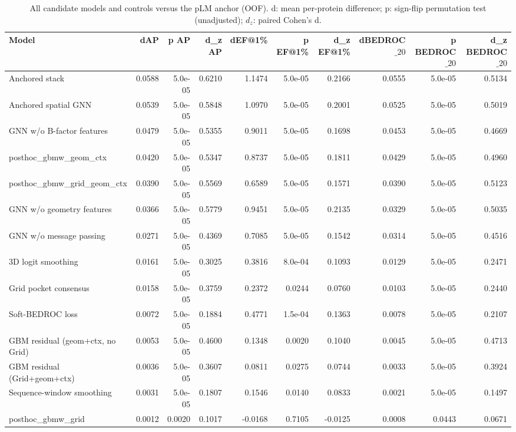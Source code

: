 \begin{table}[t]
\centering
\small
\caption{All candidate models and controls versus the pLM anchor (OOF). d: mean per-protein difference; p: sign-flip permutation test (unadjusted); $d_z$: paired Cohen's d.}
\label{tab:table3_components_oof}
\begin{tabular}{lrrrrrrrrr}
\toprule
Model & dAP & p AP & d\_z AP & dEF@1\% & p EF@1\% & d\_z EF@1\% & dBEDROC$\_{20}$ & p BEDROC$\_{20}$ & d\_z BEDROC$\_{20}$ \\
\midrule
Anchored stack & 0.0588 & 5.0e-05 & 0.6210 & 1.1474 & 5.0e-05 & 0.2166 & 0.0555 & 5.0e-05 & 0.5134 \\
Anchored spatial GNN & 0.0539 & 5.0e-05 & 0.5848 & 1.0970 & 5.0e-05 & 0.2001 & 0.0525 & 5.0e-05 & 0.5019 \\
GNN w/o B-factor features & 0.0479 & 5.0e-05 & 0.5355 & 0.9011 & 5.0e-05 & 0.1698 & 0.0453 & 5.0e-05 & 0.4669 \\
posthoc\_gbmw\_geom\_ctx & 0.0420 & 5.0e-05 & 0.5347 & 0.8737 & 5.0e-05 & 0.1811 & 0.0429 & 5.0e-05 & 0.4960 \\
posthoc\_gbmw\_grid\_geom\_ctx & 0.0390 & 5.0e-05 & 0.5569 & 0.6589 & 5.0e-05 & 0.1571 & 0.0390 & 5.0e-05 & 0.5123 \\
GNN w/o geometry features & 0.0366 & 5.0e-05 & 0.5779 & 0.9451 & 5.0e-05 & 0.2135 & 0.0329 & 5.0e-05 & 0.5035 \\
GNN w/o message passing & 0.0271 & 5.0e-05 & 0.4369 & 0.7085 & 5.0e-05 & 0.1542 & 0.0314 & 5.0e-05 & 0.4516 \\
3D logit smoothing & 0.0161 & 5.0e-05 & 0.3025 & 0.3816 & 8.0e-04 & 0.1093 & 0.0129 & 5.0e-05 & 0.2471 \\
Grid pocket consensus & 0.0158 & 5.0e-05 & 0.3759 & 0.2372 & 0.0244 & 0.0760 & 0.0103 & 5.0e-05 & 0.2440 \\
Soft-BEDROC loss & 0.0072 & 5.0e-05 & 0.1884 & 0.4771 & 1.5e-04 & 0.1363 & 0.0078 & 5.0e-05 & 0.2107 \\
GBM residual (geom+ctx, no Grid) & 0.0053 & 5.0e-05 & 0.4600 & 0.1348 & 0.0020 & 0.1040 & 0.0045 & 5.0e-05 & 0.4713 \\
GBM residual (Grid+geom+ctx) & 0.0036 & 5.0e-05 & 0.3607 & 0.0811 & 0.0275 & 0.0744 & 0.0033 & 5.0e-05 & 0.3924 \\
Sequence-window smoothing & 0.0031 & 5.0e-05 & 0.1807 & 0.1546 & 0.0140 & 0.0833 & 0.0021 & 5.0e-05 & 0.1497 \\
posthoc\_gbmw\_grid & 0.0012 & 0.0020 & 0.1017 & -0.0168 & 0.7105 & -0.0125 & 0.0008 & 0.0443 & 0.0671 \\

\end{tabular}
\end{table}
